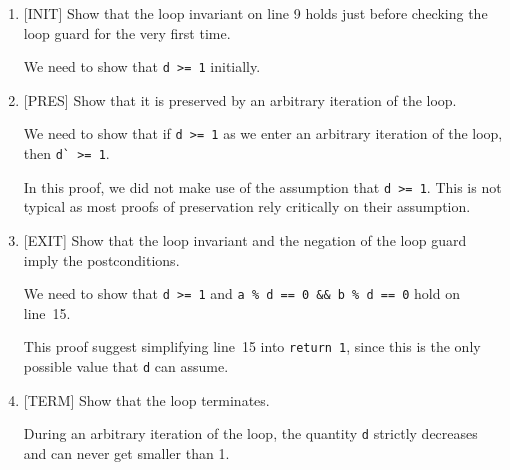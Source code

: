 \begin{flex}
\begin{solution}
\begin{enumerate}[label=\alph*]
\item {[INIT]} %
  Show that the loop invariant on line 9 holds
  just before checking the loop guard for the very first time.

  We need to show that \lstinline'd >= 1' initially.
  \begin{enumerate}[label=\Alph*.]
  \end{enumerate}

\item {[PRES]} %
  Show that it is preserved by an arbitrary iteration of the loop.

  We need to show that if \lstinline'd >= 1' as we enter an arbitrary
  iteration of the loop, then \lstinline'd` >= 1'.
  \begin{enumerate}[label=\Alph*.]
  \end{enumerate}
  In this proof, we did not make use of the assumption that %
  \lstinline'd >= 1'.  This is not typical as most proofs of
  preservation rely critically on their assumption.

\item {[EXIT]} %
  Show that the loop invariant and the negation of the loop guard
  imply the postconditions.

  We need to show that \lstinline'd >= 1' and %
  \lstinline'a % d == 0 && b % d == 0' hold on
  line~15.

  \begin{enumerate}[label=\Alph*.]
  \end{enumerate}
  This proof suggest simplifying line~15 into
  \lstinline'return 1', since this is the only possible value that
  \lstinline'd' can assume.

\item {[TERM]} %
  Show that the loop terminates.

  During an arbitrary iteration of the loop, the quantity
  \lstinline'd' strictly decreases and can never get smaller than 1.


\end{enumerate}
\end{solution}
\end{flex}

